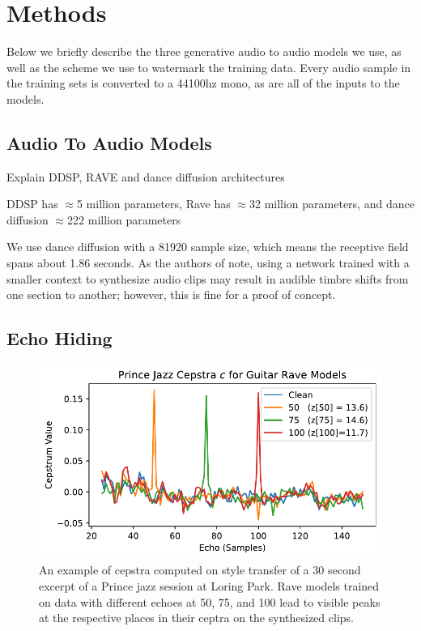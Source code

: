 \documentclass[letterpaper]{article} %
\begin{document}
\section{Methods}

Below we briefly describe the three generative audio to audio models we use, as well as the scheme we use to watermark the training data. Every audio sample in the training sets is converted to a 44100hz mono, as are all of the inputs to the models.

\subsection{Audio To Audio Models}

Explain DDSP, RAVE and dance diffusion architectures

DDSP has $\approx$5 million parameters, Rave has $\approx$32 million parameters, and dance diffusion $\approx$222 million parameters

We use dance diffusion with a 81920 sample size, which means the receptive field spans about 1.86 seconds.  As the authors of \cite{hawthornemulti} note, using a network trained with a smaller context to synthesize audio clips may result in audible timbre shifts from one section to another; however, this is fine for a proof of concept.


\subsection{Echo Hiding}
\label{sec:echohiding}

\begin{figure}
    \centering
    \includegraphics[width=\columnwidth]{figs/RaveCepstra.pdf}
    \caption{An example of cepstra computed on style transfer of a 30 second excerpt of a Prince jazz session at Loring Park.  Rave models trained on data with different echoes at 50, 75, and 100 lead to visible peaks at the respective places in their ceptra on the synthesized clips.}
    \label{fig:ravecepstra}
\end{figure}
\end{document}
